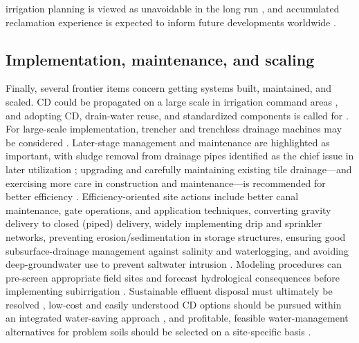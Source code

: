 \documentclass[11pt]{article}
\begin{document}
irrigation planning is viewed as unavoidable in the long run \parencite{Sarwar2001}, and accumulated reclamation experience is expected to inform future developments worldwide \parencite{TeKrony2004}.

\subsection{Implementation, maintenance, and scaling}
Finally, several frontier items concern getting systems built, maintained, and scaled. CD could be propagated on a large scale in irrigation command areas \parencite{Karegoudar2019}, and adopting CD, drain-water reuse, and standardized components is called for \parencite{Gopalakrishnan2007}. For large-scale implementation, trencher and trenchless drainage machines may be considered \parencite{Ritzema2008b}. Later-stage management and maintenance are highlighted as important, with sludge removal from drainage pipes identified as the chief issue in later utilization \parencite{Yan2013b}; upgrading and carefully maintaining existing tile drainage---and exercising more care in construction and maintenance---is recommended for better efficiency \parencite{AbdElMageed2009}. Efficiency-oriented site actions include better canal maintenance, gate operations, and application techniques, converting gravity delivery to closed (piped) delivery, widely implementing drip and sprinkler networks, preventing erosion/sedimentation in storage structures, ensuring good subsurface-drainage management against salinity and waterlogging, and avoiding deep-groundwater use to prevent saltwater intrusion \parencite{Kanber2019}. Modeling procedures can pre-screen appropriate field sites and forecast hydrological consequences before implementing subirrigation \parencite{deWit2024}. Sustainable effluent disposal must ultimately be resolved \parencite{Datta2002}, low-cost and easily understood CD options should be pursued within an integrated water-saving approach \parencite{Wahba2005}, and profitable, feasible water-management alternatives for problem soils should be selected on a site-specific basis \parencite{MOSTAGHIMI1989,Sharma1998}.

\printbibliography
\end{document}
